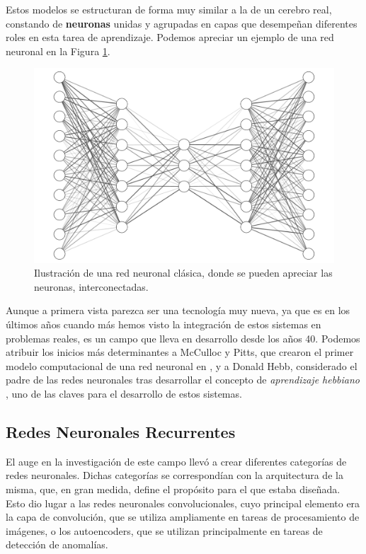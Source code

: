 Estos modelos se estructuran de forma muy similar a la de un cerebro real, constando de \textbf{neuronas} unidas y agrupadas en capas que desempeñan diferentes roles en esta tarea de aprendizaje. Podemos apreciar un ejemplo de una red neuronal en la Figura \ref{fig:neural-net}.

\begin{figure}[h]
    \centering
    \includegraphics[width=.7\textwidth]{media/neural-net.pdf}
    \caption{Ilustración de una red neuronal clásica, donde se pueden apreciar las neuronas, interconectadas.}
    \label{fig:neural-net}
\end{figure}

Aunque a primera vista parezca ser una tecnología muy nueva, ya que es en los últimos años cuando más hemos visto la integración de estos sistemas en problemas reales, es un campo que lleva en desarrollo desde los años 40. Podemos atribuir los inicios más determinantes a McCulloc y Pitts, que crearon el primer modelo computacional de una red neuronal en \cite{mcculloch43a}, y a Donald Hebb, considerado el padre de las redes neuronales tras desarrollar el concepto de \textit{aprendizaje hebbiano} \cite{hebb-organization-of-behavior-1949}, uno de las claves para el desarrollo de estos sistemas.

\subsection{Redes Neuronales Recurrentes}
El auge en la investigación de este campo llevó a crear diferentes categorías de redes neuronales. Dichas categorías se correspondían con la arquitectura de la misma, que, en gran medida, define el propósito para el que estaba diseñada. Esto dio lugar a las redes neuronales convolucionales, cuyo principal elemento era la capa de convolución, que se utiliza ampliamente en tareas de procesamiento de imágenes, o los autoencoders, que se utilizan principalmente en tareas de detección de anomalías.

